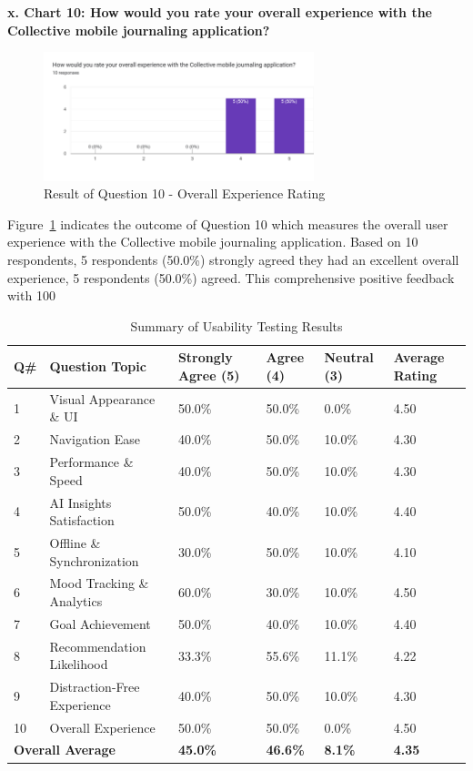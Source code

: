 \textbf{x. Chart 10: How would you rate your overall experience with the Collective mobile journaling application?}

\begin{figure}[H]
\centering
\includegraphics[width=0.7\textwidth]{files/imgs/survey/chart10_overall_experience.png}
\caption{Result of Question 10 - Overall Experience Rating}
\label{fig:chart10-overall}
\end{figure}

Figure~\ref{fig:chart10-overall} indicates the outcome of Question 10 which measures the overall user experience with the Collective mobile journaling application. Based on 10 respondents, 5 respondents (50.0\%) strongly agreed they had an excellent overall experience, 5 respondents (50.0\%) agreed. This comprehensive positive feedback with 100%

\begin{table}[H]
\centering
\caption{Summary of Usability Testing Results}
\label{tab:usability-summary}
\begin{tabular}{|p{1cm}|p{8cm}|p{1.5cm}|p{1.5cm}|p{1.5cm}|p{1.5cm}|}
\hline
\textbf{Q\#} & \textbf{Question Topic} & \textbf{Strongly Agree (5)} & \textbf{Agree (4)} & \textbf{Neutral (3)} & \textbf{Average Rating} \\
\hline
1 & Visual Appearance \& UI & 50.0\% & 50.0\% & 0.0\% & 4.50 \\
\hline
2 & Navigation Ease & 40.0\% & 50.0\% & 10.0\% & 4.30 \\
\hline
3 & Performance \& Speed & 40.0\% & 50.0\% & 10.0\% & 4.30 \\
\hline
4 & AI Insights Satisfaction & 50.0\% & 40.0\% & 10.0\% & 4.40 \\
\hline
5 & Offline \& Synchronization & 30.0\% & 50.0\% & 10.0\% & 4.10 \\
\hline
6 & Mood Tracking \& Analytics & 60.0\% & 30.0\% & 10.0\% & 4.50 \\
\hline
7 & Goal Achievement & 50.0\% & 40.0\% & 10.0\% & 4.40 \\
\hline
8 & Recommendation Likelihood & 33.3\% & 55.6\% & 11.1\% & 4.22 \\
\hline
9 & Distraction-Free Experience & 40.0\% & 50.0\% & 10.0\% & 4.30 \\
\hline
10 & Overall Experience & 50.0\% & 50.0\% & 0.0\% & 4.50 \\
\hline
\multicolumn{2}{|l|}{\textbf{Overall Average}} & \textbf{45.0\%} & \textbf{46.6\%} & \textbf{8.1\%} & \textbf{4.35} \\
\hline
\end{tabular}
\end{table}

